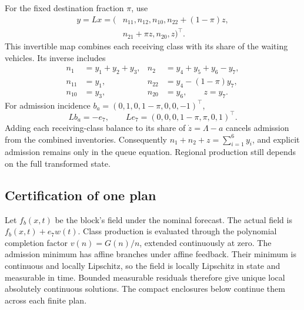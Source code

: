 \documentclass[preprint,12pt]{elsarticle}
\begin{document}
For the fixed destination fraction $\pi$, use
\begin{equation}
\begin{aligned}
y=Lx=(&n_{11},n_{12},n_{10},n_{22}+(1-\pi)z,\\
      &n_{21}+\pi z,n_{20},z)^\top.
\end{aligned}
\label{eq:new-conservation-coordinates}
\end{equation}
This invertible map combines each receiving class with its share of the
waiting vehicles. Its inverse includes
\begin{equation}
 \begin{aligned}
 n_1&=y_1+y_2+y_3,&n_2&=y_4+y_5+y_6-y_7,\\
 n_{11}&=y_1,&n_{22}&=y_4-(1-\pi)y_7,\\
 n_{10}&=y_3,&n_{20}&=y_6,\qquad z=y_7.
 \end{aligned}
 \label{eq:new-inverse-coordinates}
\end{equation}
For admission incidence $b_a=(0,1,0,1-\pi,0,0,-1)^\top$,
\begin{equation}
 Lb_a=-e_7,
 \qquad Le_7=(0,0,0,1-\pi,\pi,0,1)^\top.
 \label{eq:new-conservation-incidence}
\end{equation}
Adding each receiving-class balance to its share of
$\dot z=\Lambda-a$ cancels admission from the combined inventories.
Consequently $n_1+n_2+z=\sum_{i=1}^6y_i$, and explicit admission remains
only in the queue equation. Regional production still depends on the
full transformed state.

\subsection{Certification of one plan}
\label{app:new-enclosure-proof}

Let $f_b(x,t)$ be the block's field under the nominal forecast. The actual
field is $f_b(x,t)+e_7w(t)$. Class production is evaluated through the
polynomial completion factor $v(n)=G(n)/n$, extended continuously at zero.
The admission minimum has affine branches under affine feedback. Their
minimum is continuous and locally Lipschitz, so the field is locally
Lipschitz in state and measurable in time. Bounded measurable residuals
therefore give unique local absolutely continuous solutions. The compact
enclosures below continue them across each finite plan.
\end{document}
